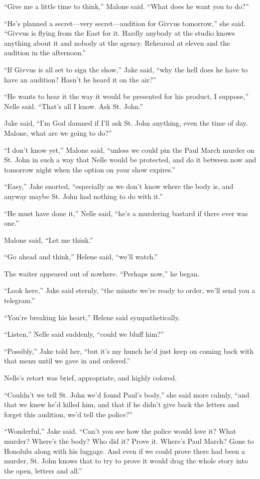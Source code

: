 \documentclass{novel}
\begin{document}
“Give me a little time to think,” Malone said. “What does he want you to do?”

“He’s planned a secret—very secret—audition for Givvus tomorrow,” she said. “Givvus is flying from the East for it. Hardly anybody at the studio knows anything about it and nobody at the agency. Rehearsal at eleven and the audition in the afternoon.”

“If Givvus is all set to sign the show,” Jake said, “why the hell does he have to have an audition? Hasn’t he heard it on the air?”

“He wants to hear it the way it would be presented for his product, I suppose,” Nelle said. “That’s all I know. Ask St. John.”

Jake said, “I’m God damned if I'll ask St. John anything, even the time of day. Malone, what are we going to do?”

“I don’t know yet,” Malone said, “unless we could pin the Paul March murder on St. John in such a way that Nelle would be protected, and do it between now and tomorrow night when the option on your show expires.”

“Easy,” Jake snorted, “especially as we don’t know where the body is, and anyway maybe St. John had nothing to do with it.”

“He must have done it,” Nelle said, “he’s a murdering bastard if there ever was one.”

Malone said, “Let me think.”

“Go ahead and think,” Helene said, “we’ll watch.”

The waiter appeared out of nowhere. “Perhaps now,” he began.

“Look here,” Jake said sternly, “the minute we’re ready to order, we’ll send you a telegram.”

“You’re breaking his heart,” Helene said sympathetically.

“Listen,” Nelle said suddenly, “could we bluff him?”

“Possibly,” Jake told her, “but it’s my hunch he’d just keep on coming back with that menu until we gave in and ordered.”

Nelle’s retort was brief, appropriate, and highly colored.

“Couldn’t we tell St. John we’d found Paul’s body,” she said more calmly, “and that we knew he’d killed him, and that if he didn’t give back the letters and forget this audition, we’d tell the police?”

“Wonderful,” Jake said. “Can’t you see how the police would love it? What murder? Where’s the body? Who did it? Prove it. Where’s Paul March? Gone to Honolulu along with his luggage. And even if we could prove there had been a murder, St. John knows that to try to prove it would drag the whole story into the open, letters and all.”
\end{document}
